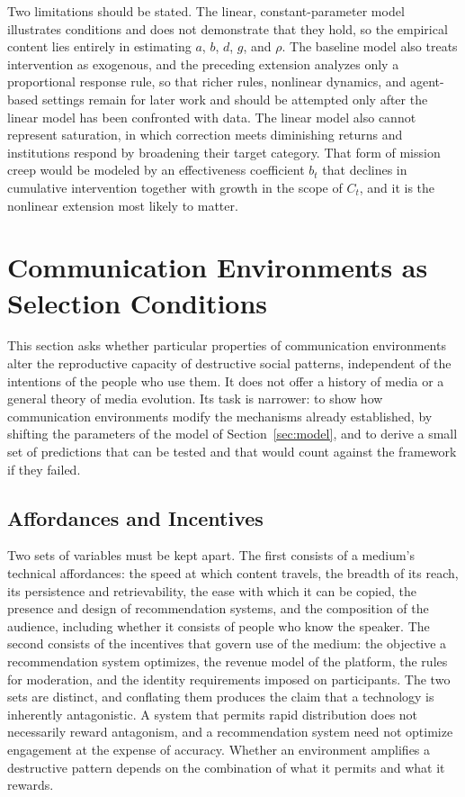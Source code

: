 \documentclass[12pt]{article}
\theoremstyle{remark}
\begin{document}
Two limitations should be stated. The linear, constant-parameter model illustrates conditions and does not demonstrate that they hold, so the empirical content lies entirely in estimating $a$, $b$, $d$, $g$, and $\rho$. The baseline model also treats intervention as exogenous, and the preceding extension analyzes only a proportional response rule, so that richer rules, nonlinear dynamics, and agent-based settings remain for later work and should be attempted only after the linear model has been confronted with data. The linear model also cannot represent saturation, in which correction meets diminishing returns and institutions respond by broadening their target category. That form of mission creep would be modeled by an effectiveness coefficient $b_t$ that declines in cumulative intervention together with growth in the scope of $C_t$, and it is the nonlinear extension most likely to matter.

\section{Communication Environments as Selection Conditions}
\label{sec:media}

This section asks whether particular properties of communication environments alter the reproductive capacity of destructive social patterns, independent of the intentions of the people who use them. It does not offer a history of media or a general theory of media evolution. Its task is narrower: to show how communication environments modify the mechanisms already established, by shifting the parameters of the model of Section~\ref{sec:model}, and to derive a small set of predictions that can be tested and that would count against the framework if they failed.

\subsection{Affordances and Incentives}

Two sets of variables must be kept apart. The first consists of a medium's technical affordances: the speed at which content travels, the breadth of its reach, its persistence and retrievability, the ease with which it can be copied, the presence and design of recommendation systems, and the composition of the audience, including whether it consists of people who know the speaker. The second consists of the incentives that govern use of the medium: the objective a recommendation system optimizes, the revenue model of the platform, the rules for moderation, and the identity requirements imposed on participants. The two sets are distinct, and conflating them produces the claim that a technology is inherently antagonistic. A system that permits rapid distribution does not necessarily reward antagonism, and a recommendation system need not optimize engagement at the expense of accuracy. Whether an environment amplifies a destructive pattern depends on the combination of what it permits and what it rewards.
\end{document}
